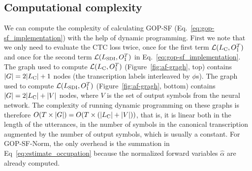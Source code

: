 \subsection{Computational complexity}
We can compute the complexity of calculating GOP-SF (Eq.~\ref{eq:gop-sf_implementation}) with the help of dynamic programming.
First we note that we only need to evaluate the CTC loss twice, once for the first term $\mathcal{L}(L_{\text{C}}, O_1^T)$ and once for the second term $\mathcal{L}(L_{\text{SDI}}, O_1^T)$ in Eq.~\ref{eq:gop-sf_implementation}.
The graph used to compute $\mathcal{L}(L_{\text{C}}, O_1^T)$ (Figure~\ref{fig:af-gragh}, top) contains $|G| = 2|L_{\text{C}}|+1$ nodes (the transcription labels interleaved by $\phi$s).
The graph used to compute $\mathcal{L}(L_{\text{SDI}}, O_1^T)$ (Figure~\ref{fig:af-gragh}, bottom) contains $|G| = 2|L_{\text{C}}| + |V|$ nodes, where $V$ is the set of output symbols from the neural network.
The complexity of running dynamic programming on these graphs is therefore $O(T\times |G|) = O(T\times (|L_{\text{C}}|+|V|))$, that is, it is linear both in the length of the utterances, in the number of symbols in the canonical transcription augmented by the number of output symbols, which is usually a constant.
For GOP-SF-Norm, the only overhead is the summation in Eq~\ref{eq:estimate_occupation} because the normalized forward variables $\hat{\alpha}$ are already computed.


